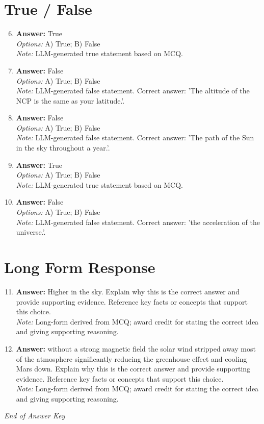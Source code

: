 \documentclass[12pt]{article}
\begin{document}
\section*{True / False}
\begin{enumerate}[label=\arabic*.]
\setcounter{enumi}{5}
\item \textbf{Answer:} True
\\ \textit{Options:} A) True; B) False
\\ \textit{Note:} LLM-generated true statement based on MCQ.
\item \textbf{Answer:} False
\\ \textit{Options:} A) True; B) False
\\ \textit{Note:} LLM-generated false statement. Correct answer: 'The altitude of the NCP is the same as your latitude.'.
\item \textbf{Answer:} False
\\ \textit{Options:} A) True; B) False
\\ \textit{Note:} LLM-generated false statement. Correct answer: 'The path of the Sun in the sky throughout a year.'.
\item \textbf{Answer:} True
\\ \textit{Options:} A) True; B) False
\\ \textit{Note:} LLM-generated true statement based on MCQ.
\item \textbf{Answer:} False
\\ \textit{Options:} A) True; B) False
\\ \textit{Note:} LLM-generated false statement. Correct answer: 'the acceleration of the universe.'.
\end{enumerate}

\section*{Long Form Response}
\begin{enumerate}[label=\arabic*.]
\setcounter{enumi}{10}
\item \textbf{Answer:} Higher in the sky. Explain why this is the correct answer and provide supporting evidence. Reference key facts or concepts that support this choice.
\\ \textit{Note:} Long-form derived from MCQ; award credit for stating the correct idea and giving supporting reasoning.
\item \textbf{Answer:} without a strong magnetic field the solar wind stripped away most of the atmosphere significantly reducing the greenhouse effect and cooling Mars down. Explain why this is the correct answer and provide supporting evidence. Reference key facts or concepts that support this choice.
\\ \textit{Note:} Long-form derived from MCQ; award credit for stating the correct idea and giving supporting reasoning.
\end{enumerate}

\vfill
\noindent\textit{End of Answer Key}
\end{document}
